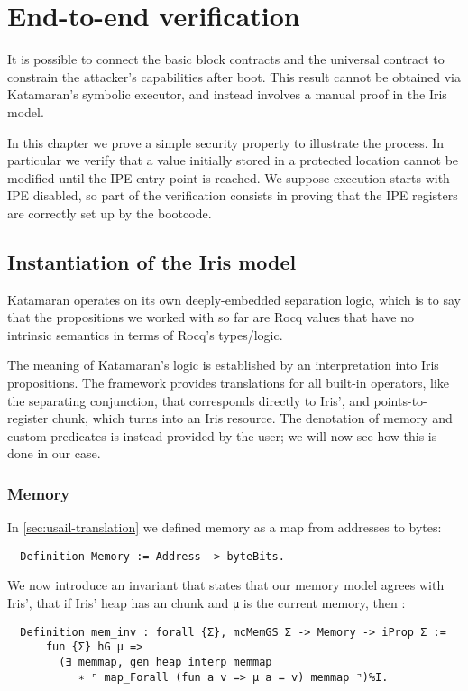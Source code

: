 \chapter{End-to-end verification}
\label{ch:end-to-end}

It is possible to connect the basic block contracts and the universal contract to constrain the attacker's capabilities after boot. This result cannot be obtained via Katamaran's symbolic executor, and instead involves a manual proof in the Iris model.

In this chapter we prove a simple security property to illustrate the process. In particular we verify that a value initially stored in a protected location cannot be modified until the IPE entry point is reached. We suppose execution starts with IPE disabled, so part of the verification consists in proving that the IPE registers are correctly set up by the bootcode.

\section{Instantiation of the Iris model}

Katamaran operates on its own deeply-embedded separation logic, which is to say that the propositions we worked with so far are Rocq values that have no intrinsic semantics in terms of Rocq's types/logic.

The meaning of Katamaran's logic is established by an interpretation into Iris propositions. The framework provides translations for all built-in operators, like the separating conjunction, that corresponds directly to Iris', and points-to-register chunk, which turns into an Iris resource. The denotation of memory and custom predicates is instead provided by the user; we will now see how this is done in our case.

\subsection{Memory}

In \cref{sec:usail-translation} we defined memory as a map from addresses to bytes:
\begin{verbatim}
  Definition Memory := Address -> byteBits.
\end{verbatim}
We now introduce an invariant that states that our memory model agrees with Iris', \ie that if Iris' heap has an  chunk and \texttt{\small μ} is the current memory, then :
\begin{verbatim}
  Definition mem_inv : forall {Σ}, mcMemGS Σ -> Memory -> iProp Σ :=
      fun {Σ} hG μ =>
        (∃ memmap, gen_heap_interp memmap
           ∗ ⌜ map_Forall (fun a v => μ a = v) memmap ⌝)%I.
\end{verbatim}

